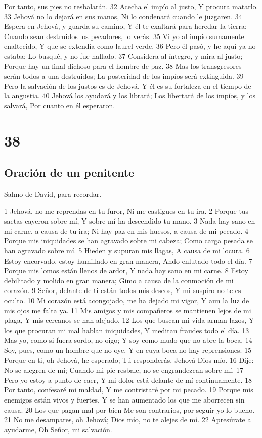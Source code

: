 Por tanto, sus pies no resbalarán.
32 Acecha el impío al justo,
Y procura matarlo.
33 Jehová no lo dejará en sus manos,
Ni lo condenará cuando le juzgaren.
34 Espera en Jehová, y guarda su camino,
Y él te exaltará para heredar la tierra;
Cuando sean destruidos los pecadores, lo verás.
35 Vi yo al impío sumamente enaltecido,
Y que se extendía como laurel verde.
36 Pero él pasó, y he aquí ya no estaba;
Lo busqué, y no fue hallado.
37 Considera al íntegro, y mira al justo;
Porque hay un final dichoso para el hombre de paz.
38 Mas los transgresores serán todos a una destruidos;
La posteridad de los impíos será extinguida.
39 Pero la salvación de los justos es de Jehová,
Y él es su fortaleza en el tiempo de la angustia.
40 Jehová los ayudará y los librará;
Los libertará de los impíos, y los salvará,
Por cuanto en él esperaron.

\chapter{38}

\section*{Oración de un penitente}

Salmo de David, para recordar.

1 Jehová, no me reprendas en tu furor,
Ni me castigues en tu ira.
2 Porque tus saetas cayeron sobre mí,
Y sobre mí ha descendido tu mano.
3 Nada hay sano en mi carne, a causa de tu ira;
Ni hay paz en mis huesos, a causa de mi pecado.
4 Porque mis iniquidades se han agravado sobre mi cabeza;
Como carga pesada se han agravado sobre mí.
5 Hieden y supuran mis llagas,
A causa de mi locura.
6 Estoy encorvado, estoy humillado en gran manera,
Ando enlutado todo el día.
7 Porque mis lomos están llenos de ardor,
Y nada hay sano en mi carne.
8 Estoy debilitado y molido en gran manera;
Gimo a causa de la conmoción de mi corazón.
9 Señor, delante de ti están todos mis deseos,
Y mi suspiro no te es oculto.
10 Mi corazón está acongojado, me ha dejado mi vigor,
Y aun la luz de mis ojos me falta ya.
11 Mis amigos y mis compañeros se mantienen lejos de mi plaga,
Y mis cercanos se han alejado.
12 Los que buscan mi vida arman lazos,
Y los que procuran mi mal hablan iniquidades,
Y meditan fraudes todo el día.
13 Mas yo, como si fuera sordo, no oigo;
Y soy como mudo que no abre la boca.
14 Soy, pues, como un hombre que no oye,
Y en cuya boca no hay reprensiones.
15 Porque en ti, oh Jehová, he esperado;
Tú responderás, Jehová Dios mío.
16 Dije: No se alegren de mí;
Cuando mi pie resbale, no se engrandezcan sobre mí.
17 Pero yo estoy a punto de caer,
Y mi dolor está delante de mí continuamente.
18 Por tanto, confesaré mi maldad,
Y me contristaré por mi pecado.
19 Porque mis enemigos están vivos y fuertes,
Y se han aumentado los que me aborrecen sin causa.
20 Los que pagan mal por bien
Me son contrarios, por seguir yo lo bueno.
21 No me desampares, oh Jehová;
Dios mío, no te alejes de mí.
22 Apresúrate a ayudarme,
Oh Señor, mi salvación.


